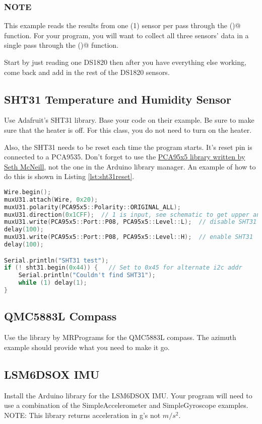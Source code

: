 \subsubsection{NOTE}
This example reads the results from one (1) sensor per pass through the 
\lstinline@loop()@ function. For your program, you will want to collect 
all three sensors' data in a single pass through the \lstinline@loop()@ 
function. 

Start by just reading one DS1820 then after you have everything
else working, come back and add in the rest of the DS1820 sensors.

\subsection{SHT31 Temperature and Humidity Sensor}
Use Adafruit's SHT31 library. Base your code on their example. Be sure 
to make sure that the heater is off. For this class, you do not need to 
turn on the heater.

Also, the SHT31 needs to be reset each time the program starts. It's 
reset pin is connected to a PCA9535. Don't forget to use the 
\href{https://github.com/semcneil/PCA95x5}{PCA95x5 library written by Seth McNeill}, 
not the one in the Arduino library manager. An example of how to do this
is shown in Listing \ref{lst:sht31reset}.

\begin{lstlisting}[caption={This listing shows how to reset the SHT31.},
label={lst:sht31reset},language=C++]
Wire.begin();
muxU31.attach(Wire, 0x20);
muxU31.polarity(PCA95x5::Polarity::ORIGINAL_ALL);
muxU31.direction(0x1CFF);  // 1 is input, see schematic to get upper and lower bytes
muxU31.write(PCA95x5::Port::P08, PCA95x5::Level::L);  // disable SHT31
delay(100);
muxU31.write(PCA95x5::Port::P08, PCA95x5::Level::H);  // enable SHT31
delay(100);

Serial.println("SHT31 test");
if (! sht31.begin(0x44)) {   // Set to 0x45 for alternate i2c addr
    Serial.println("Couldn't find SHT31");
    while (1) delay(1);
}
\end{lstlisting}

\subsection{QMC5883L Compass}
Use the library by MRPrograms for the QMC5883L compass. The azimuth example 
should provide what you need to make it go.

\subsection{LSM6DSOX IMU}
Install the Arduino library for the LSM6DSOX IMU. Your program will need 
to use a combination of the SimpleAccelerometer and SimpleGyroscope examples.
NOTE: This library returns acceleration in g's not $m/s^2$.

